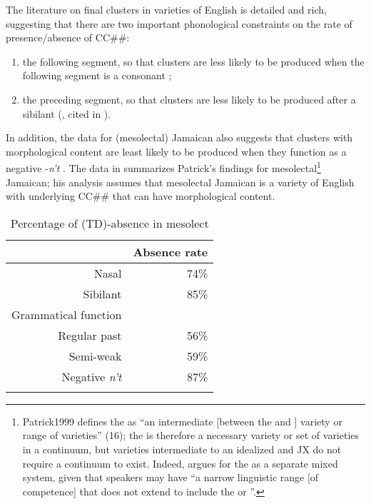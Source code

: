 The literature on final clusters in varieties of English is detailed and rich, suggesting that there are two important phonological constraints on the rate of  presence\slash absence of CC\#\#:

\begin{enumerate}
	\item the following segment, so that clusters are less likely to be produced when the following segment is a consonant \citep[217]{Labov1972}; 
	\item the preceding segment, so that clusters are less likely to be produced after a sibilant (\citealt{Santa1991}, cited in \citealt[131]{Patrick1999}). 
\end{enumerate}

In addition, the data for (mesolectal) Jamaican also suggests that clusters with morphological content are least likely to be produced when they function as a negative -\textit{n’t} \citep[150]{Patrick1999}.  The data in  summarizes Patrick’s findings for mesolectal\footnote{Patrick1999 defines the  as “an intermediate [between the  and ] variety or range of varieties” (16); the  is therefore a necessary variety or set of varieties in a continuum, but varieties intermediate to an idealized  and JX do not require a continuum to exist.  Indeed, \citet[25]{Meade2001} argues for the  as a separate mixed system, given that speakers may have “a narrow linguistic range [of competence] that does not extend to include the  or ”.}  Jamaican; his analysis assumes that mesolectal Jamaican is a variety of English with underlying CC\#\# that can have morphological content.
\begin{table}
\begin{tabular}{rr}
\lsptoprule
\multicolumn{1}{c}{Preceding segment} & \multicolumn{1}{c}{Absence rate}\\
\midrule  
Nasal                      &  74\%\\
Sibilant                   &  85\%\\\midrule
Grammatical function       &      \\\midrule
Regular past               &  56\%\\ 
Semi-weak                  &  59\%\\
Negative \textit{n’t}      &  87\%\\
\lspbottomrule
\end{tabular} 
\caption{Percentage of (TD)-absence in mesolect \citep[140, 150, 157]{Patrick1999}}
\label{tab:2.13}
\end{table}

